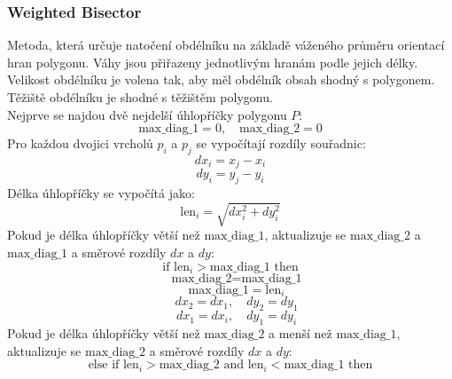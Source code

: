 \subsubsection{Weighted Bisector}
Metoda, která určuje natočení obdélníku na základě váženého průměru orientací hran polygonu. Váhy jsou přiřazeny jednotlivým hranám podle jejich délky. Velikost obdélníku je volena tak, aby měl obdélník obsah shodný s polygonem. Těžiště obdélníku je shodné s těžištěm polygonu.\\
Nejprve se najdou dvě nejdelší úhlopříčky polygonu \( P \):
\begin{equation}
    \text{max\_diag\_1} = 0, \quad \text{max\_diag\_2} = 0
\end{equation}
Pro každou dvojici vrcholů \( p_i \) a \( p_j \) se vypočítají rozdíly souřadnic:
\begin{equation}
    dx_i = x_j - x_i
\end{equation}
\begin{equation}
    dy_i = y_j - y_i
\end{equation}
Délka úhlopříčky se vypočítá jako:
\begin{equation}
    \text{len}_i = \sqrt{dx_i^2 + dy_i^2}
\end{equation}
Pokud je délka úhlopříčky větší než \( \text{max\_diag\_1} \), aktualizuje se \( \text{max\_diag\_2} \) a \( \text{max\_diag\_1} \) a směrové rozdíly \( dx \) a \( dy \):
\begin{equation}
    \text{if } \text{len}_i > \text{max\_diag\_1} \text{ then}
\end{equation}
\begin{equation}
    \quad \text{max\_diag\_2} = \text{max\_diag\_1}
\end{equation}
\begin{equation}
    \quad \text{max\_diag\_1} = \text{len}_i
\end{equation}
\begin{equation}
    \quad dx_2 = dx_1, \quad dy_2 = dy_1
\end{equation}
\begin{equation}
    \quad dx_1 = dx_i, \quad dy_1 = dy_i
\end{equation}
Pokud je délka úhlopříčky větší než \( \text{max\_diag\_2} \) a menší než \( \text{max\_diag\_1} \), aktualizuje se \( \text{max\_diag\_2} \) a směrové rozdíly \( dx \) a \( dy \):
\begin{equation}
    \text{else if } \text{len}_i > \text{max\_diag\_2} \text{ and } \text{len}_i < \text{max\_diag\_1} \text{ then}
\end{equation}

